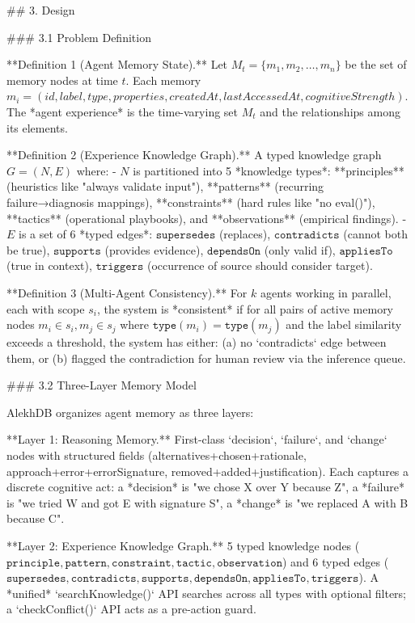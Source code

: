 ## 3. Design

### 3.1 Problem Definition

**Definition 1 (Agent Memory State).** Let $M_t = \{m_1, m_2, \ldots, m_n\}$ be the set of memory nodes at time $t$. Each memory $m_i = (id, label, type, properties, createdAt, lastAccessedAt, cognitiveStrength)$. The *agent experience* is the time-varying set $M_t$ and the relationships among its elements.

**Definition 2 (Experience Knowledge Graph).** A typed knowledge graph $G = (N, E)$ where:
- $N$ is partitioned into 5 *knowledge types*: **principles** (heuristics like "always validate input"), **patterns** (recurring failure→diagnosis mappings), **constraints** (hard rules like "no eval()"), **tactics** (operational playbooks), and **observations** (empirical findings).
- $E$ is a set of 6 *typed edges*: $\texttt{supersedes}$ (replaces), $\texttt{contradicts}$ (cannot both be true), $\texttt{supports}$ (provides evidence), $\texttt{dependsOn}$ (only valid if), $\texttt{appliesTo}$ (true in context), $\texttt{triggers}$ (occurrence of source should consider target).

**Definition 3 (Multi-Agent Consistency).** For $k$ agents working in parallel, each with scope $s_i$, the system is *consistent* if for all pairs of active memory nodes $m_i \in s_i, m_j \in s_j$ where $\texttt{type}(m_i) = \texttt{type}(m_j)$ and the label similarity exceeds a threshold, the system has either: (a) no `contradicts` edge between them, or (b) flagged the contradiction for human review via the inference queue.

### 3.2 Three-Layer Memory Model

AlekhDB organizes agent memory as three layers:

**Layer 1: Reasoning Memory.** First-class `decision`, `failure`, and `change` nodes with structured fields (alternatives+chosen+rationale, approach+error+errorSignature, removed+added+justification). Each captures a discrete cognitive act: a *decision* is "we chose X over Y because Z", a *failure* is "we tried W and got E with signature S", a *change* is "we replaced A with B because C".

**Layer 2: Experience Knowledge Graph.** 5 typed knowledge nodes ($\texttt{principle}, \texttt{pattern}, \texttt{constraint}, \texttt{tactic}, \texttt{observation}$) and 6 typed edges ($\texttt{supersedes}, \texttt{contradicts}, \texttt{supports}, \texttt{dependsOn}, \texttt{appliesTo}, \texttt{triggers}$). A *unified* `searchKnowledge()` API searches across all types with optional filters; a `checkConflict()` API acts as a pre-action guard.

